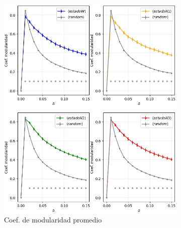 \documentclass{article}
\begin{document}
\begin{figure} [!htb]
	\centering
	\begin{subfigure}[b]{0.43\textwidth}
		\includegraphics[width= \textwidth]{fg/curvas_modularidad_mann_whitney.png}
        \caption{Coef. de modularidad promedio}
		\label{fg_modularidad}
	\end{subfigure}
	\begin{subfigure}[b]{0.43\textwidth}

\end{subfigure}
\end{figure}
\end{document}
